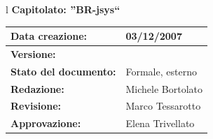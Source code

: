 \documentclass[11pt,titlepage,a4paper]{report}
\begin{document}
\begin{center}
\thispagestyle{plain}
\begin{table}[htbp]
\large{
\begin{tabular}{l}
\Large{\textbf{\textsf{Capitolato: ''BR-jsys``}}} \\
\begin{tabular}{||p{6cm}||p{6cm}||}
\hline
\textbf{Data creazione:} & 03/12/2007 \\ \hline
\textbf{Versione:} & \lv \\ \hline
\textbf{Stato del documento:} & Formale, esterno \\ \hline
\textbf{Redazione:} & Michele Bortolato\\ \hline
\textbf{Revisione:} & Marco Tessarotto\\ \hline
\textbf{Approvazione:}  & Elena Trivellato\\ \hline
\end{tabular} \\
\end{tabular}
}
\end{table}


\end{center}
\end{document}
